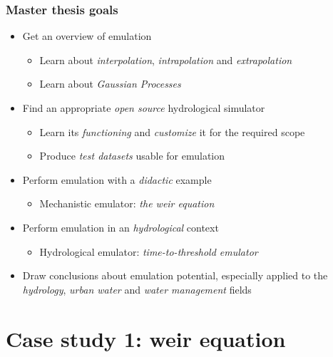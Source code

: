 \documentclass[xcolor=dvipsnames, USenglish]{beamer}  %
\begin{document}
  \begin{frame}
    \frametitle{Master thesis goals}
    \begin{itemize}
      \item Get an overview of emulation
      \begin{itemize}
        \item Learn about \emph{interpolation}, \emph{intrapolation} and \emph{extrapolation}
        \item Learn about \emph{Gaussian Processes}
      \end{itemize}
      \item Find an appropriate \emph{open source} hydrological simulator
      \begin{itemize}
        \item Learn its \emph{functioning} and \emph{customize} it for the required scope
        \item Produce \emph{test datasets} usable for emulation
      \end{itemize}
      \item Perform emulation with a \emph{didactic} example
      \begin{itemize}
        \item Mechanistic emulator: \emph{the weir equation}
      \end{itemize}
      \item Perform emulation in an \emph{hydrological} context
      \begin{itemize}
        \item Hydrological emulator: \emph{time-to-threshold emulator}
      \end{itemize}
      \item Draw conclusions about emulation potential, especially applied to the \emph{hydrology},
            \emph{urban water} and \emph{water management} fields
    \end{itemize}
  \end{frame}



\section{Case study 1: weir equation}
\end{document}
